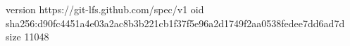 version https://git-lfs.github.com/spec/v1
oid sha256:d90fc4451a4e03a2ac8b3b221cb1f37f5e96a2d1749f2aa0538fedee7dd6ad7d
size 11048
